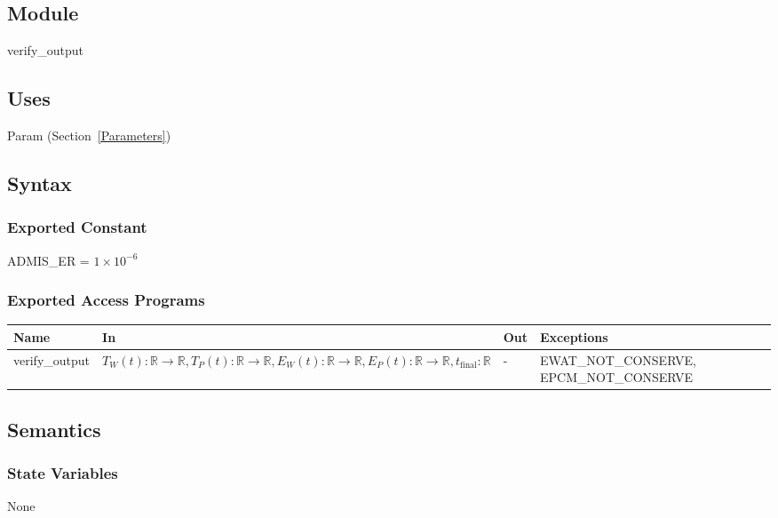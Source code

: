 \documentclass[12pt, titlepage]{article}
\begin{document}
\subsection{Module}

verify\_output

\subsection{Uses}

Param (Section~\ref{Parameters})

\subsection{Syntax}

\subsubsection{Exported Constant}

ADMIS\_ER = $1 \times 10^{-6}$

\subsubsection{Exported Access Programs}

\begin{center}
\begin{tabular}{p{3cm} p{7cm} p{1cm} p{2cm}}
\hline
\textbf{Name} & \textbf{In} & \textbf{Out} & \textbf{Exceptions} \\
\hline
verify\_output & $T_W(t):\mathbb{R} \rightarrow \mathbb{R},
                 T_P(t):\mathbb{R} \rightarrow \mathbb{R},
                 E_W(t):\mathbb{R} \rightarrow \mathbb{R},
                 E_P(t):\mathbb{R} \rightarrow \mathbb{R},
                 t_\text{final}: \mathbb{R}$ & - & EWAT\_NOT\_CONSERVE, EPCM\_NOT\_CONSERVE \\
\hline
\end{tabular}
\end{center}

\subsection{Semantics}

\subsubsection{State Variables}

None
\end{document}
